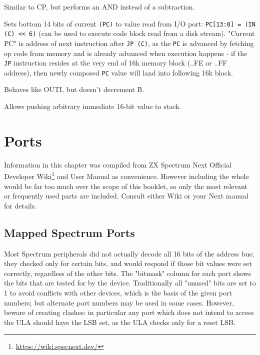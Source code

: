 \documentclass[twoside,openright,a4paper]{book}
\begin{document}
\begin{basedescript}{
	\desclabelstyle{\multilinelabel}
	\desclabelwidth{3cm}}


	Similar to CP, but performs an AND instead of a subtraction.
	

	Sets bottom 14 bits of current {\tt (PC)} to value read from I/O port: {\tt PC[13:0] = (IN (C) << 6)} (can be used to execute code block read from a disk stream). "Current PC" is address of next instruction after {\tt JP (C)}, as the {\tt PC} is advanced by fetching op code from memory and is already advanced when execution happens - if the {\tt JP} instruction resides at the very end of 16k memory block (..FE or ..FF address), then newly composed {\tt PC} value will land into following 16k block.


	Behaves like OUTI, but doesn't decrement B.


	Allows pushing arbitrary immediate 16-bit value to stack.

\end{basedescript}


\pagebreak
\section{Ports}

Information in this chapter was compiled from ZX Spectrum Next Official Developer Wiki\footnote{\url{https://wiki.specnext.dev/}} and User Manual as convenience. However including the whole would be far too much over the scope of this booklet, so only the most relevant or frequently used parts are included. Consult either Wiki or your Next manual for details.


\subsection{Mapped Spectrum Ports}

Most Spectrum peripherals did not actually decode all 16 bits of the address bus; they checked only for certain bits, and would respond if those bit values were set correctly, regardless of the other bits. The "bitmask" column for each port shows the bits that are tested for by the device. Traditionally all "unused" bits are set to 1 to avoid conflicts with other devices, which is the basis of the given port numbers; but alternate port numbers may be used in some cases. However, beware of creating clashes: in particular any port which does not intend to access the ULA should have the LSB set, as the ULA checks only for a reset LSB.
\end{document}
